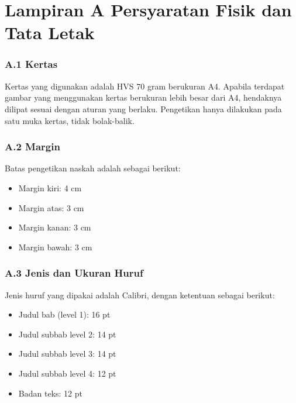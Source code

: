 
\chapter*{Lampiran A Persyaratan Fisik dan Tata Letak}

\subsection*{A.1 Kertas}

Kertas yang digunakan adalah HVS 70 gram berukuran A4. Apabila terdapat
gambar yang menggunakan kertas berukuran lebih besar dari A4, hendaknya
dilipat sesuai dengan aturan yang berlaku. Pengetikan hanya dilakukan
pada satu muka kertas, tidak bolak-balik.

\subsection*{A.2 Margin}

Batas pengetikan naskah adalah sebagai berikut:

\begin{itemize}
  \item Margin kiri: 4 cm
  \item Margin atas: 3 cm
  \item Margin kanan: 3 cm
  \item Margin bawah: 3 cm
\end{itemize}

\subsection*{A.3 Jenis dan Ukuran Huruf}

Jenis huruf yang dipakai adalah Calibri, dengan ketentuan sebagai
berikut:

\begin{itemize}
  \item Judul bab (level 1): 16 pt
  \item Judul subbab level 2: 14 pt
  \item Judul subbab level 3: 14 pt
  \item Judul subbab level 4: 12 pt
  \item Badan teks: 12 pt
\end{itemize}

